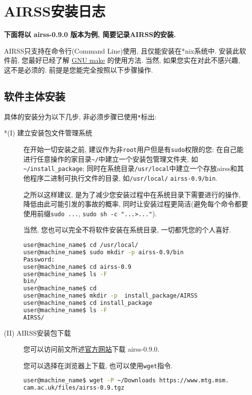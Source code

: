 \documentclass[a4paper, 10pt]{article}
\begin{document}
\newpage
\appendix
\section{AIRSS安装日志}
\label{sec:airss-install} 
\textbf{下面将以 airss-0.9.0 版本为例, 简要记录AIRSS的安装.}

AIRSS只支持在命令行(Command Line)使用, 且仅能安装在*nix系统中. 安装此软件前, 您最好已经了解 \href{https://www.gnu.org/software/make/manual/}{GNU make} 的使用方法. 当然, 如果您实在对此不感兴趣, 这不是必须的. 前提是您能完全按照以下步骤操作.

\subsection{软件主体安装}
具体的安装分为以下几步, 非必须步骤已使用\verb|*|标出:
\begin{description}
\item [*(I) 建立安装包文件管理系统] 在开始一切安装之前, 建议作为非\verb|root|用户但是有\verb|sudo|权限的您: 在自己能进行任意操作的家目录\verb|~/|中建立一个安装包管理文件夹, 如\verb|~/install_package|; 同时在系统目录\verb|/usr/local|中建立一个存放airss和其他程序二进制可执行文件的目录, 如\verb|/usr/local/| \verb|airss-0.9/bin|. 

之所以这样建议, 是为了减少您安装过程中在系统目录下需要进行的操作, 降低由此可能引发的事故的概率, 同时让安装过程更简洁(避免每个命令都要使用前缀\verb|sudo ...|, \verb|sudo sh -c "...>..."|). 

当然, 您也可以完全不将软件安装在系统目录, 一切都凭您的个人喜好.
\begin{lstlisting}[language={bash}]
user@machine_name$ cd /usr/local/
user@machine_name$ sudo mkdir -p airss-0.9/bin
Password:
user@machine_name$ cd airss-0.9
user@machine_name$ ls -F 
bin/
user@machine_name$ cd
user@machine_name$ mkdir -p  install_package/AIRSS
user@machine_name$ cd install_package
user@machine_name$ ls -F
AIRSS/
\end{lstlisting}

\item [(II) AIRSS安装包下载]您可以访问前文所述\href{https://www.mtg.msm.cam.ac.uk/Codes/AIRSS}{官方网站}下载 airss-0.9.0.

您可以选择在浏览器上下载, 也可以使用\verb|wget|指令.

\begin{lstlisting}[language={bash}]
user@machine_name$ wget -P ~/Downloads https://www.mtg.msm.
cam.ac.uk/files/airss-0.9.tgz
\end{lstlisting}


\end{description}
\end{document}
